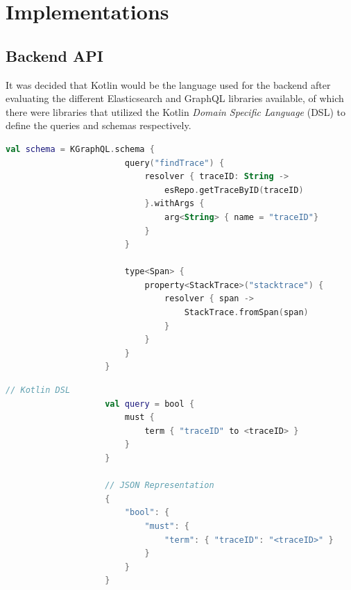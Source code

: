 \documentclass[12pt,pdftex,titlepage]{report}
\begin{document}

        \newpage          
        \section{Implementations}    
            \subsection{Backend API}
                It was decided that Kotlin would be the language used for the backend after evaluating the different Elasticsearch and GraphQL libraries available, of which there were libraries 
                that utilized the Kotlin \textit{Domain Specific Language} (DSL) to define the queries and schemas respectively.

                \begin{lstlisting}[caption=Kotlin snippet of defining the GraphQL schema using the Kotlin DSL., language=Kotlin, gobble=20]
                    val schema = KGraphQL.schema { 
                        query("findTrace") { 
                            resolver { traceID: String ->
                                esRepo.getTraceByID(traceID)
                            }.withArgs { 
                                arg<String> { name = "traceID"}
                            }
                        }

                        type<Span> {
                            property<StackTrace>("stacktrace") { 
                                resolver { span ->
                                    StackTrace.fromSpan(span)
                                }
                            }
                        }
                    }                
                \end{lstlisting}

                \begin{lstlisting}[caption={Comparison between Elasticsearch query using Kotlin DSL and the query in its JSON representation, where $\langle$traceID$\rangle$ refers
                    to a variable storing the trace identifier.}, language=Kotlin, gobble=20]
                    // Kotlin DSL
                    val query = bool {
                        must {
                            term { "traceID" to <traceID> }
                        }
                    }

                    // JSON Representation
                    {
                        "bool": {
                            "must": {
                                "term": { "traceID": "<traceID>" }
                            }
                        }
                    }
                \end{lstlisting}
\end{document}
